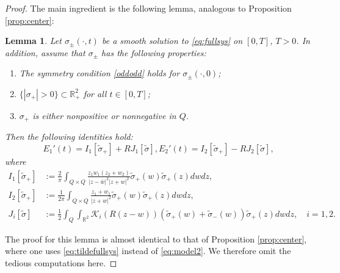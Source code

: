 \documentclass[11pt,reqno]{amsproc}
\newtheorem{lemma}{Lemma}
\newcommand{\R}{\mathbb{R}}
\newcommand{\calK}{\mathcal{K}}
\newcommand{\tsig}{\tilde{\sigma}}
\begin{document}
\begin{proof}
    The main ingredient is the following lemma, analogous to Proposition \ref{prop:center}:
    \begin{lemma}
        Let $\sigma_\pm(\cdot,t)$ be a smooth solution to \eqref{eq:fullsys} on $[0,T]$, $T > 0$. In addition, assume that $\sigma_\pm$ has the following properties:
    \begin{enumerate}
        \item The symmetry condition \eqref{oddodd} holds for $\sigma_\pm(\cdot,0)$;
        \item $\{|\sigma_+| > 0\} \subset \R^2_+$ for all $t \in [0,T]$;
        \item $\sigma_+$ is either nonpositive or nonnegative in $Q$. 
    \end{enumerate}
    Then the following identities hold:
    \begin{subequations}
    \begin{equation}
        \label{eq:tE1'}
        E_1'(t) = I_1[\tsig_+] + RJ_1[\tilde\sigma]  ,
    \end{equation}  
    \begin{equation}
        \label{eq:tE2'}
        E_2'(t) = I_2[\tsig_+] - RJ_2[\tilde\sigma],
    \end{equation}  
    \end{subequations}
    where
    \begin{align*}
        I_1[\tsig_+] &:= \frac2\pi \int_{Q\times Q} \frac{z_1w_1(z_2 + w_2)}{|z-\bar w|^2 |z+w|^2}\tsig_+(w)\tsig_+(z)dwdz,\\
        I_2[\tsig_+] &:= \frac{1}{2\pi}\int_{Q\times Q} \frac{z_1 + w_1}{|z+w|^2}\tsig_+(w)\tsig_+(z)dwdz,\\
        J_i[\tilde\sigma] &:= \frac{1}{2}\int_Q\int_{\R^2} \calK_i(R(z-w))\left(\tsig_+(w) + \tsig_-(w)\right)\tsig_+(z)dwdz,\quad i = 1,2.
    \end{align*}
    \end{lemma}
    The proof for this lemma is almost identical to that of Proposition \ref{prop:center}, where one uses \eqref{eq:tildefullsys} instead of \eqref{eq:model2}. We therefore omit the tedious computations here.


\end{proof}
\end{document}
